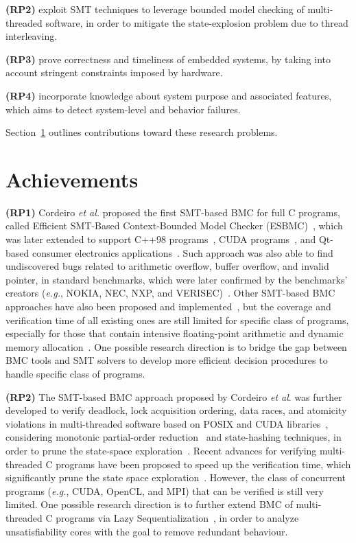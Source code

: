 \documentclass{acm_sen_article}
\begin{document}
\textbf{(RP2)} exploit SMT techniques to leverage bounded model checking of multi-threaded software, in order to mitigate the state-explosion problem due to thread interleaving.
	
\textbf{(RP3)} prove correctness and timeliness of embedded systems, by taking into account stringent constraints imposed by hardware.
	
\textbf{(RP4)} incorporate knowledge about system purpose and associated features, which aims to detect system-level and behavior failures.

Section~\ref{achievements} outlines contributions toward these research problems.

\section{Achievements}
\label{achievements}

\textbf{(RP1)} Cordeiro {\it et al.} proposed the first SMT-based BMC for full C programs, called Efficient SMT-Based Context-Bounded Model Checker (ESBMC)~\cite{Cordeiro12}, which was later extended to support C++98 programs~\cite{ECBS13}, CUDA programs~\cite{Pereira15}, and Qt-based consumer electronics applications~\cite{Sousa15}. Such approach was also able to find undiscovered bugs related to arithmetic overflow, buffer overflow, and invalid pointer, in standard benchmarks, which were later confirmed by the benchmarks' creators ({\it e.g.}, NOKIA, NEC, NXP, and VERISEC)~\cite{CordeiroF11,Cordeiro12}. Other SMT-based BMC approaches have also been proposed and implemented~\cite{MerzFS12}, but the coverage and verification time of all existing ones are still limited for specific class of programs, especially for those that contain intensive floating-point arithmetic and dynamic memory allocation~\cite{Beyer14,BeyerSVCOMP15}. One possible research direction is to bridge the gap between BMC tools and SMT solvers to develop more efficient decision procedures to handle specific class of programs.

\textbf{(RP2)} The SMT-based BMC approach proposed by Cordeiro {\it et al}. was further developed to verify deadlock, lock acquisition ordering, data races, and atomicity violations in multi-threaded software based on POSIX and CUDA libraries~\cite{CordeiroF11,Pereira15}, considering monotonic partial-order reduction~\cite{KahlonWG09} and state-hashing techniques, in order to prune the state-space exploration~\cite{morse15}. Recent advances for verifying multi-threaded C programs have been proposed to speed up the verification time, which significantly prune the state space exploration~\cite{Inverso14,civl15}. However, the class of concurrent programs ({\it e.g.}, CUDA, OpenCL, and MPI) that can be verified is still very limited. One possible research direction is to further extend BMC of multi-threaded C programs via Lazy Sequentialization~\cite{Inverso14}, in order to analyze unsatisfiability cores with the goal to remove redundant behaviour.
\end{document}
